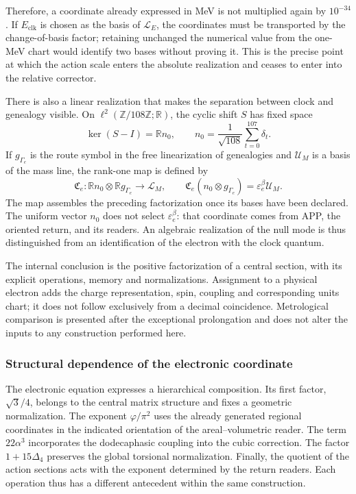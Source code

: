 Therefore, a coordinate already expressed in MeV is not multiplied again
by \(10^{-34}\). If \(E_{\mathrm{clk}}\) is chosen as the basis of
\(\mathcal L_E\), the coordinates must be transported by the change-of-basis
factor; retaining unchanged the numerical value from the one-MeV chart
would identify two bases without proving it. This is the precise point
at which the action scale enters the absolute realization and ceases to
enter into the relative corrector.

There is also a linear realization that makes the separation
between clock and genealogy visible. On
\(\ell^2(\mathbb Z/108\mathbb Z;\mathbb R)\), the cyclic
shift \(S\) has fixed space
\[
 \ker(S-I)=\mathbb R n_0,\qquad
 n_0=\frac1{\sqrt{108}}\sum_{t=0}^{107}\delta_t.
\]
If \(g_{\Gamma_e}\) is the route symbol in the free linearization
of genealogies and \(\mathcal U_M\) is a basis of the mass line,
the rank-one map is defined by
\begin{equation}
 \mathfrak C_e:
 \mathbb R n_0\otimes\mathbb R g_{\Gamma_e}\longrightarrow\mathcal L_M,
 \qquad
 \mathfrak C_e(n_0\otimes g_{\Gamma_e})
 =\varepsilon_e^\beta\mathcal U_M.
 \label{x_reciprocidad:eq:el-rango-uno}
\end{equation}
The map assembles the preceding factorization once its bases have been declared.
The uniform vector \(n_0\) does not select \(\varepsilon_e^\beta\):
that coordinate comes from APP, the oriented return, and its readers.
An algebraic realization of the null mode is thus distinguished from an
identification of the electron with the clock quantum.

The internal conclusion is the positive factorization of a central
section, with its explicit operations, memory and normalizations.
Assignment to a physical electron adds the charge representation,
spin, coupling and corresponding units chart; it does not
follow exclusively from a decimal coincidence. Metrological
comparison is presented after the exceptional prolongation and does not alter
the inputs to any construction performed here.


\subsubsection{Structural dependence of the electronic coordinate}

The electronic equation expresses a hierarchical composition. Its first
factor, \(\sqrt3/4\), belongs to the central matrix structure and fixes
a geometric normalization. The exponent \(\varphi/\pi^2\) uses the
already generated regional coordinates in the indicated orientation of the
areal--volumetric reader. The term \(22\alpha^3\) incorporates the dodecaphasic
coupling into the cubic correction. The factor \(1+15\Delta_4\) preserves
the global torsional normalization. Finally, the quotient of the action
sections acts with the exponent determined by the return readers.
Each operation thus has a different antecedent within the same
construction.

